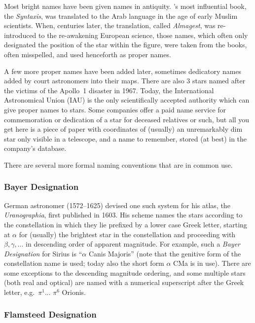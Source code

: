 Most bright names have been given names in antiquity. 's most
influential book, the \emph{Syntaxis}, was translated to the Arab
language in the age of early Muslim scientists. When, centuries later,
the translation, called \emph{Almagest}, was re-introduced to the
re-awakening European science, those names, which often only designated
the position of the star within the figure, were taken from the books,
often misspelled, and used henceforth as proper names.

A few more proper names have been added later, sometimes dedicatory
names added by court astronomers into their maps. There are also 3
stars named after the victims of the Apollo~1 disaster in 1967.
Today, the International Astronomical Union (IAU) is the only
scientifically accepted authority which can give proper names to
stars. Some companies offer a paid name service for commemoration or
dedication of a star for deceased relatives or such, but all you get
here is a piece of paper with coordinates of (usually) an unremarkably
dim star only visible in a telescope, and a name to remember, stored
(at best) in the company's database.

There are several more formal naming conventions that are in common use.

\subsubsection{Bayer Designation}
\label{sec:Phenomena:StarNames:Bayer}

German astronomer  (1572--1625) devised one such system for his
atlas, the \emph{Uranographia}, first published in 1603. His scheme
names the stars according to the constellation in which they lie
prefixed by a lower case Greek letter, starting at $\alpha$ for
(usually) the brightest star in the constellation and proceeding with
$\beta, \gamma, \ldots$ in descending order of apparent magnitude. For
example, such a \emph{Bayer Designation} for Sirius is ``$\alpha$
Canis Majoris'' (note that the genitive form of the constellation name
is used; today also the short form $\alpha$ CMa is in use). There are
some exceptions to the descending magnitude ordering, and some
multiple stars (both real and optical) are named with a numerical
superscript after the Greek letter, e.g.\ $\pi^1$...  $\pi^6$ Orionis.

\subsubsection{Flamsteed Designation}
\label{sec:Phenomena:StarNames:Flamsteed}


